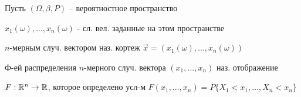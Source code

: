 
Пусть $(\Omega, \beta, P)$ -- вероятностное пространство

$x_1(\omega),...,x_n(\omega)$ - сл. вел. заданные на этом пространстве

\OPR $n$-мерным случ. вектором наз. кортеж $\overrightarrow{x}=(x_1(\omega),...,x_n(\omega))$

\OPR Ф-ей распределения $n$-мерного случ. вектора $(x_1,...,x_n)$ наз. отображение 

$F:\mathbb{R}^n\rightarrow\mathbb{R}$, которое определено усл-м $F(x_1,...,x_n)=P\{X_1<x_1,...,X_n<x_n\}$

